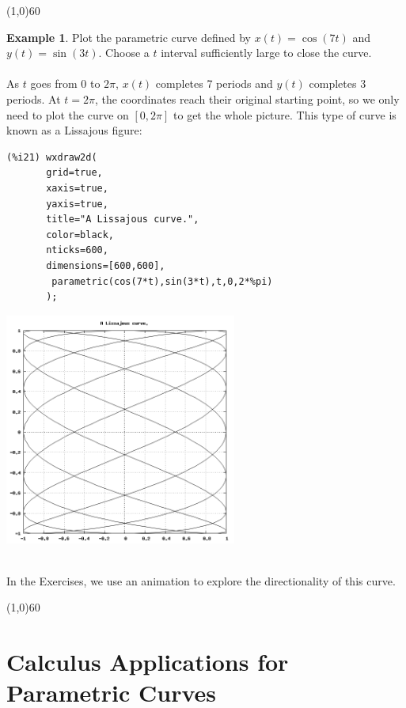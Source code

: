 \documentclass[10.5pt,twoside]{report}
\theoremstyle{definition}
\newtheorem{exmp}{Example}[section]
\begin{document}
\line(1,0){60}
\linethickness{0.5mm}

\begin{exmp} Plot the parametric curve defined by $x(t)=\cos(7t)$ and $y(t)=\sin(3t)$.  Choose a $t$ interval sufficiently large to close the curve.\\

${}$\\

As $t$ goes from $0$ to $2\pi$, $x(t)$ completes 7 periods and $y(t)$ completes 3 periods.  At $t=2\pi$, the coordinates reach their original starting point, so we only need to plot the curve on $[0,2\pi]$ to get the whole picture.  This type of curve is known as a Lissajous figure:

\begin{verbatim}
(%i21) wxdraw2d(
       grid=true,
       xaxis=true,
       yaxis=true,
       title="A Lissajous curve.",
       color=black,
       nticks=600,
       dimensions=[600,600],
        parametric(cos(7*t),sin(3*t),t,0,2*%pi)
       );
\end{verbatim}

\includegraphics[width=3in]{example_5_1_3_1}

${}$\\
In the Exercises, we use an animation to explore the directionality of this curve.

\end{exmp}

\line(1,0){60}
\linethickness{0.5mm}
\pagebreak


\pagebreak
\section{Calculus Applications for Parametric Curves}\label{Calculus Applications for Parametric Curves}
\end{document}
